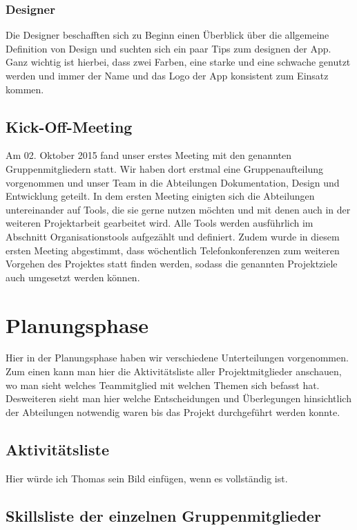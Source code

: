\documentclass[12pt,a4paper]{article}
\begin{document}
\subsubsection{Designer}
Die Designer beschafften sich zu Beginn einen Überblick über die allgemeine Definition von Design und suchten sich ein paar Tips zum designen der App.
Ganz wichtig ist hierbei, dass zwei Farben, eine starke und eine schwache genutzt werden und immer der Name und das Logo der App konsistent zum Einsatz kommen.
\newpage

\subsection{Kick-Off-Meeting}
Am 02. Oktober  2015 fand unser erstes Meeting mit den genannten Gruppenmitgliedern statt. 
Wir haben dort erstmal eine Gruppenaufteilung vorgenommen und unser Team in die Abteilungen Dokumentation, Design und Entwicklung geteilt. 
In dem ersten Meeting einigten sich die Abteilungen untereinander auf Tools, die sie gerne nutzen möchten und mit denen auch in der weiteren Projektarbeit gearbeitet wird. Alle Tools werden ausführlich im Abschnitt Organisationstools aufgezählt und definiert.
Zudem wurde in diesem ersten Meeting abgestimmt, dass wöchentlich Telefonkonferenzen zum weiteren Vorgehen des Projektes statt finden werden, sodass die genannten Projektziele auch umgesetzt werden können. 


\newpage

\section{Planungsphase}
Hier in der Planungsphase haben wir verschiedene Unterteilungen vorgenommen. Zum einen kann man hier die Aktivitätsliste aller Projektmitglieder anschauen,  wo man sieht welches Teammitglied mit welchen Themen sich befasst hat. 
Desweiteren sieht man hier welche Entscheidungen und Überlegungen hinsichtlich der Abteilungen notwendig waren bis das Projekt durchgeführt werden konnte.

\subsection{Aktivitätsliste}
 Hier würde ich Thomas sein Bild einfügen, wenn es vollständig ist.
 
 \subsection{Skillsliste der einzelnen Gruppenmitglieder}
 
\end{document}
